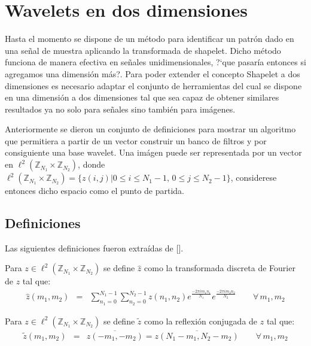 \section{Wavelets en dos dimensiones}\label{cap:w2d}

\par Hasta el momento se dispone de un m\'etodo para identificar un patr\'on dado en una se\~nal de muestra aplicando la transformada de shapelet. Dicho m\'etodo funciona de manera efectiva en se\~nales unidimensionales, ?`que pasar\'ia entonces si agregamos una dimensi\'on m\'as?. Para poder extender el concepto Shapelet a dos dimensiones es necesario adaptar el conjunto de herramientas del cual se dispone en una dimensi\'on a dos dimensiones tal que sea capaz de obtener similares resultados ya no solo para se\~nales sino tambi\'en para im\'agenes.\\

\par Anteriormente se dieron un conjunto de definiciones para mostrar un algoritmo que permitiera a partir de un vector construir un banco de filtros y por consiguiente una base wavelet. Una im\'agen puede ser representada por un vector en $\ell^2(\mathbb{Z}_{N_1}\times\mathbb{Z}_{N_2})$, donde $\ell^2(\mathbb{Z}_{N_1}\times\mathbb{Z}_{N_2})=\{z(i,j)|0\leq i \leq N_1-1,\,0\leq j\leq N_2-1\}$, considerese entonces dicho espacio como el punto de partida.

\subsection{Definiciones}

\par Las siguientes definiciones fueron extra\'idas de [\textcolor{cyan}{\cite{12}}].\\

\begin{definition}
Para $z\in\ell^2(\mathbb{Z}_{N_1}\times\mathbb{Z}_{N_2})$ se define $\hat{z}$ como la transformada discreta de Fourier de $z$ tal que:
\begin{eqnarray}
\hat{z}(m_1,m_2)&=&\sum_{n_1=0}^{N_1-1}\sum_{n_2=0}^{N_2-1}z(n_1,n_2)e^{\frac{-2\pi im_1n_1}{N_1}}e^{\frac{-2\pi im_2n_2}{N_2}}\qquad\forall\,m_1,m_2\nonumber
\end{eqnarray}
\end{definition}

\begin{definition}
Para $z\in\ell^2(\mathbb{Z}_{N_1}\times\mathbb{Z}_{N_2})$ se define $\tilde{z}$ como la reflexi\'on conjugada de $z$ tal que:
\begin{eqnarray}
\tilde{z}(m_1,m_2)&=&\overline{z(-m_1,-m_2)}=\overline{z(N_1-m_1,N_2-m_2)}\qquad\forall\,m_1,m_2\nonumber
\end{eqnarray}
\end{definition}

